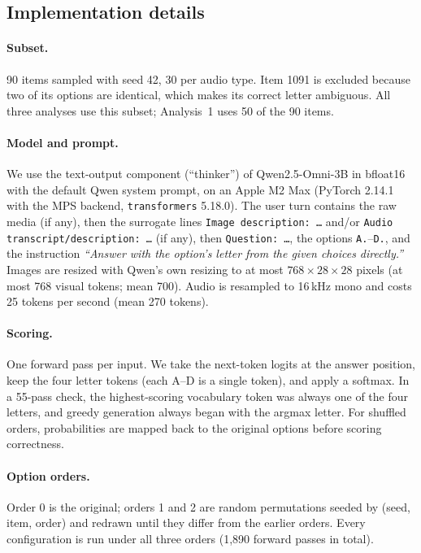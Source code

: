\documentclass{article}
\begin{document}
\subsection{Implementation details}
\label{app:impl}

\paragraph{Subset.} 90 items sampled with seed 42, 30 per audio type. Item 1091
is excluded because two of its options are identical, which makes its correct
letter ambiguous. All three analyses use this subset; Analysis~1 uses 50 of the
90 items.

\paragraph{Model and prompt.} We use the text-output component (``thinker'') of
Qwen2.5-Omni-3B in bfloat16 with the default Qwen system prompt, on an Apple M2
Max (PyTorch 2.14.1 with the MPS backend, \texttt{transformers} 5.18.0). The user
turn contains the raw media (if any), then the surrogate lines
\texttt{Image description:~\ldots} and/or \texttt{Audio transcript/description:~\ldots}
(if any), then \texttt{Question:~\ldots}, the options \texttt{A.}--\texttt{D.}, and
the instruction \emph{``Answer with the option's letter from the given choices
directly.''} Images are resized with Qwen's own resizing to at most
$768\times28\times28$ pixels (at most 768 visual tokens; mean 700). Audio is
resampled to 16\,kHz mono and costs 25 tokens per second (mean 270 tokens).

\paragraph{Scoring.} One forward pass per input. We take the next-token logits
at the answer position, keep the four letter tokens (each A--D is a single
token), and apply a softmax. In a 55-pass check, the highest-scoring vocabulary
token was always one of the four letters, and greedy generation always began
with the argmax letter. For shuffled orders, probabilities are mapped back to the
original options before scoring correctness.

\paragraph{Option orders.} Order 0 is the original; orders 1 and 2 are random
permutations seeded by (seed, item, order) and redrawn until they differ from the
earlier orders. Every configuration is run under all three orders (1,890 forward
passes in total).
\end{document}

